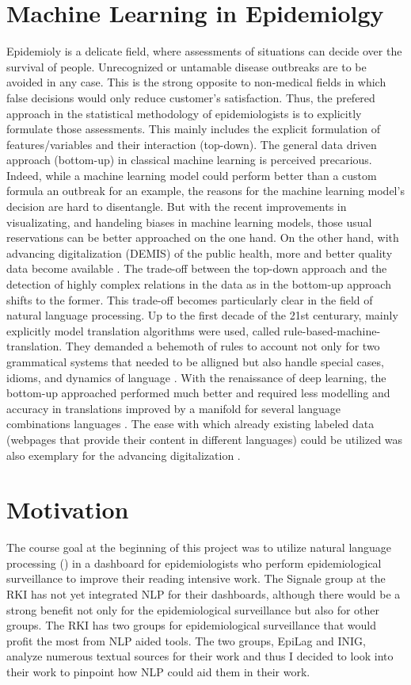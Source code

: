 \section{Machine Learning in Epidemiolgy}
Epidemioly is a delicate field, where assessments of situations can decide over the survival of people. Unrecognized or untamable disease outbreaks are to be avoided in any case. This is the strong opposite to non-medical fields in which false decisions would only reduce customer's satisfaction. Thus, the prefered approach in the statistical methodology of epidemiologists is to explicitly formulate those assessments. This mainly includes the explicit formulation of features/variables and their interaction (top-down). The general data driven approach (bottom-up) in classical machine learning is perceived precarious. Indeed, while a machine learning model could perform better than a custom formula an outbreak for an example, the reasons for the machine learning model's decision are hard to disentangle. But with the recent improvements in visualizating, and handeling biases in machine learning models, those usual reservations can be better approached on the one hand. On the other hand, with advancing digitalization (DEMIS) of the public health, more and better quality data become available \cite{DEMIS}. The trade-off between the top-down approach and the detection of highly complex relations in the data as in the bottom-up approach shifts to the former. This trade-off becomes particularly clear in the field of natural language processing. Up to the first decade of the 21st centurary, mainly explicitly model translation algorithms were used, called rule-based-machine-translation. They demanded a behemoth of rules to account not only for two grammatical systems that needed to be alligned but also handle special cases, idioms, and dynamics of language \cite{Bar-Hillel1953, Bar-Hillel1960}. With the renaissance of deep learning, the bottom-up approached performed much better and required less modelling and accuracy in translations improved by a manifold for several language combinations languages \cite{Bengio2003}. The ease with which already existing labeled data (webpages that provide their content in different languages) could be utilized was also exemplary for the advancing digitalization \cite{Macklovitch00}.



\section{Motivation}
The course goal at the beginning of this project was to utilize natural language
processing () in a dashboard for epidemiologists who perform epidemiological
surveillance to improve their reading intensive work.
The Signale group at the RKI has not yet integrated NLP for their dashboards, although there would be a strong benefit not only for the epidemiological surveillance but also for other groups. The RKI has two groups for epidemiological surveillance that would profit the most from NLP aided tools. The two groups, EpiLag and INIG, analyze numerous textual sources for their work and thus I decided to look into their work to pinpoint how NLP could aid them in their work.

